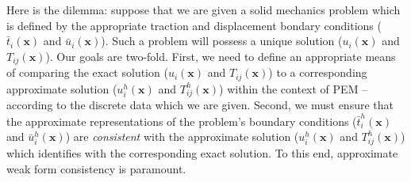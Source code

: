 \documentclass[11pt]{article} %
\begin{document}
Here is the dilemma: suppose that we are given a solid mechanics problem which is defined by the appropriate traction and displacement bondary conditions ($\bar{t}_i (\mathbf{x})$ and $\bar{u}_{i} (\mathbf{x})$). Such a problem will possess a unique solution ($u_i (\mathbf{x})$ and $T_{ij} (\mathbf{x})$). Our goals are two-fold. First, we need to define an appropriate means of comparing the exact solution ($u_i (\mathbf{x})$ and $T_{ij} (\mathbf{x})$) to a corresponding approximate solution ($u^h_i (\mathbf{x})$ and $T^h_{ij} (\mathbf{x})$) within the context of PEM -- according to the discrete data which we are given. Second, we must ensure that the approximate representations of the problem's boundary conditions ($\bar{t}^h_i (\mathbf{x})$ and $\bar{u}^h_{i} (\mathbf{x})$) are \textit{consistent} with the approximate solution ($u^h_i (\mathbf{x})$ and $T^h_{ij} (\mathbf{x})$) which identifies with the corresponding exact solution. To this end, approximate weak form consistency is paramount.
\end{document}
